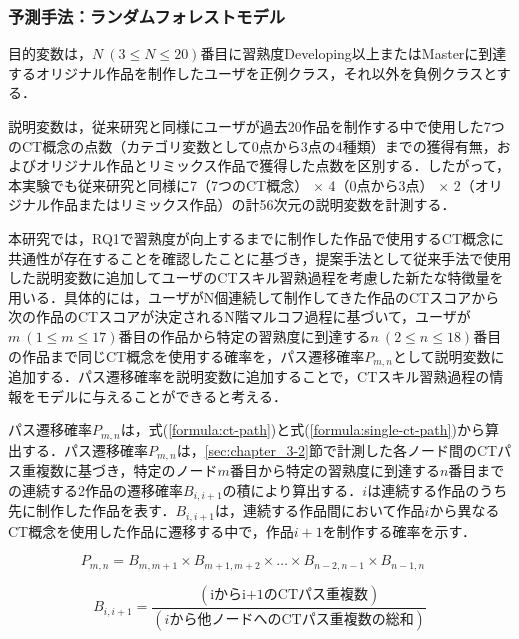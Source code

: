 \documentclass[submit]{ipsj}
\begin{document}
\subsubsection{予測手法：ランダムフォレストモデル}

目的変数は，{$N~(3 \leq N \leq 20)$}番目に習熟度Developing以上またはMasterに到達するオリジナル作品を制作したユーザを正例クラス，それ以外を負例クラスとする．

説明変数は，従来研究と同様にユーザが過去20作品を制作する中で使用した7つのCT概念の点数（カテゴリ変数として0点から3点の4種類）までの獲得有無，およびオリジナル作品とリミックス作品で獲得した点数を区別する\cite{Dasgupta_2016}．したがって，本実験でも従来研究と同様に7（7つのCT概念） $\times$ 4（0点から3点） $\times$ 2（オリジナル作品またはリミックス作品）の計56次元の説明変数を計測する．

本研究では，RQ1で習熟度が向上するまでに制作した作品で使用するCT概念に共通性が存在することを確認したことに基づき，提案手法として従来手法で使用した説明変数に追加してユーザのCTスキル習熟過程を考慮した新たな特徴量を用いる．具体的には，ユーザがN個連続して制作してきた作品のCTスコアから次の作品のCTスコアが決定されるN階マルコフ過程に基づいて，ユーザが$m~(1 \leq m \leq 17)$番目の作品から特定の習熟度に到達する$n~(2 \leq n \leq 18)$番目の作品まで同じCT概念を使用する確率を，パス遷移確率$P_{m,n}$として説明変数に追加する．パス遷移確率を説明変数に追加することで，CTスキル習熟過程の情報をモデルに与えることができると考える．

パス遷移確率$P_{m,n}$は，式(\ref{formula:ct-path})と式(\ref{formula:single-ct-path})から算出する．パス遷移確率$P_{m,n}$は，\ref{sec:chapter_3-2}節で計測した各ノード間のCTパス重複数に基づき，特定のノード$m$番目から特定の習熟度に到達する$n$番目までの連続する2作品の遷移確率$B_{i,i+1}$の積により算出する．$i$は連続する作品のうち先に制作した作品を表す．$B_{i,i+1}$は，連続する作品間において作品$i$から異なるCT概念を使用した作品に遷移する中で，作品$i+1$を制作する確率を示す．

\begin{equation}\label{formula:ct-path}
  P_{m,n} = B_{m,m+1} \times B_{m+1,m+2} \times \ldots \times B_{n-2,n-1} \times B_{n-1,n} \quad 
\end{equation}

\begin{equation}\label{formula:single-ct-path}
  B_{i,i+1} = \frac{(\mbox{iからi+1のCTパス重複数})}{(i\mbox{から他ノードへのCTパス重複数の総和})} 
\end{equation}
\end{document}
